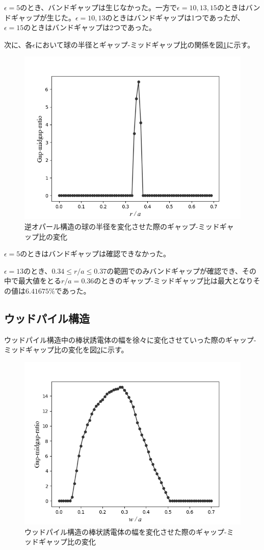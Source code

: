 \documentclass[platex,dvipdfmx]{jsreport}
\numberwithin{equation}{section}
\begin{document}
$\epsilon = 5$のとき、バンドギャップは生じなかった。一方で$\epsilon = 10, 13, 15$のときはバンドギャップが生じた。$\epsilon = 10, 13$のときはバンドギャップは1つであったが、$\epsilon = 15$のときはバンドギャップは2つであった。

次に、各$\epsilon$において球の半径とギャップ-ミッドギャップ比の関係を図\ref{fig:inv_opal}に示す。

\begin{figure}[htbp]
  \centering
  \includegraphics[width=0.6\linewidth]{results/inv_opals.png}
  \caption{逆オパール構造の球の半径を変化させた際のギャップ-ミッドギャップ比の変化}
  \label{fig:inv_opal}
\end{figure}




$\epsilon = 5$のときはバンドギャップは確認できなかった。

$\epsilon = 13$のとき、$0.34 \leq r / a \leq 0.37$の範囲でのみバンドギャップが確認でき、その中で最大値をとる$r / a = 0.36$のときのギャップ-ミッドギャップ比は最大となりその値は$6.41675 \% $であった。



\subsection{ウッドパイル構造}
ウッドパイル構造中の棒状誘電体の幅を徐々に変化させていった際のギャップ-ミッドギャップ比の変化を図\ref{fig:woodpile}に示す。

\begin{figure}[htbp]
  \centering
  \includegraphics[width=0.6\linewidth]{results/woodpile.png}
  \caption{ウッドパイル構造の棒状誘電体の幅を変化させた際のギャップ-ミッドギャップ比の変化}
  \label{fig:woodpile}
\end{figure}
\end{document}

